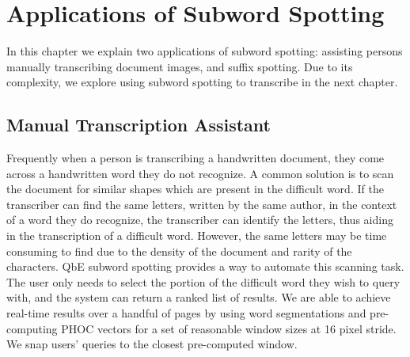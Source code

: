 \documentclass[ms,electronic,twosidetoc,letterpaper,chaptercenter,parttop,lof,lot]{byumsphd}
\begin{document}


\chapter{Applications of Subword Spotting}\label{applications}

In this chapter we explain two applications of subword spotting: assisting persons manually transcribing document images, and suffix spotting. Due to its complexity, we explore using subword spotting to transcribe in the next chapter.

\section{Manual Transcription Assistant}
Frequently when a person is transcribing a handwritten document, they come across a handwritten word they do not recognize. A common solution is to scan the document for similar shapes which are present in the difficult word. If the transcriber can find the same letters, written by the same author, in the context of a word they do recognize, the transcriber can identify the letters, thus aiding in the transcription of a difficult word. 
However, the same letters may be time consuming to find due to the density of the document and rarity of the characters. QbE subword spotting provides a way to automate this scanning task. The user only needs to select the portion of the difficult word they wish to query with, and the system can return a ranked list of results.
We are able to achieve real-time results over a handful of pages by using word segmentations and pre-computing PHOC vectors for a set of reasonable window sizes at 16  pixel stride. We snap users' queries to the closest pre-computed window. 
\end{document}
